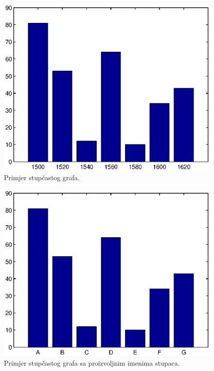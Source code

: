 \documentclass[a4paper, 10pt]{article}
\begin{document}
\begin{figure}[!htb]
\centering
\includegraphics[width=0.95\linewidth]{slike/bar_1.eps}
\caption{Primjer stupčastog grafa.}
\label{fig:bar_1}
\end{figure}

\begin{figure}[!htb]
\centering
\includegraphics[width=0.95\linewidth]{slike/bar_imenovan.eps}
\caption{Primjer stupčastog grafa sa proizvoljnim imenima stupaca.}
\label{fig:bar_imenovan}
\end{figure}

\clearpage %
\end{document}
